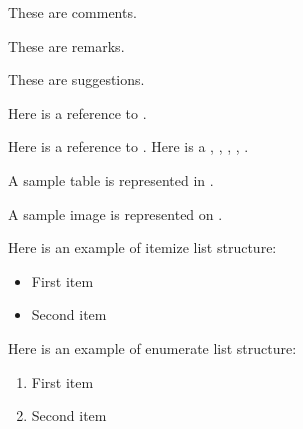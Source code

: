 
\begin{comments}
These are comments.
\end{comments}

\begin{remarks}
These are remarks.
\end{remarks}

\begin{suggestions}
These are suggestions.
\end{suggestions}

{}\newline
Here is a reference to .


Here is a reference to .
Here is a , , , , .


A sample table is represented in .


A sample image is represented on .




Here is an example of itemize list structure:
\begin{itemize}
	\item First item
	\item Second item
\end{itemize}

Here is an example of enumerate list structure:
\begin{enumerate}
	\item First item
	\item Second item
\end{enumerate}


